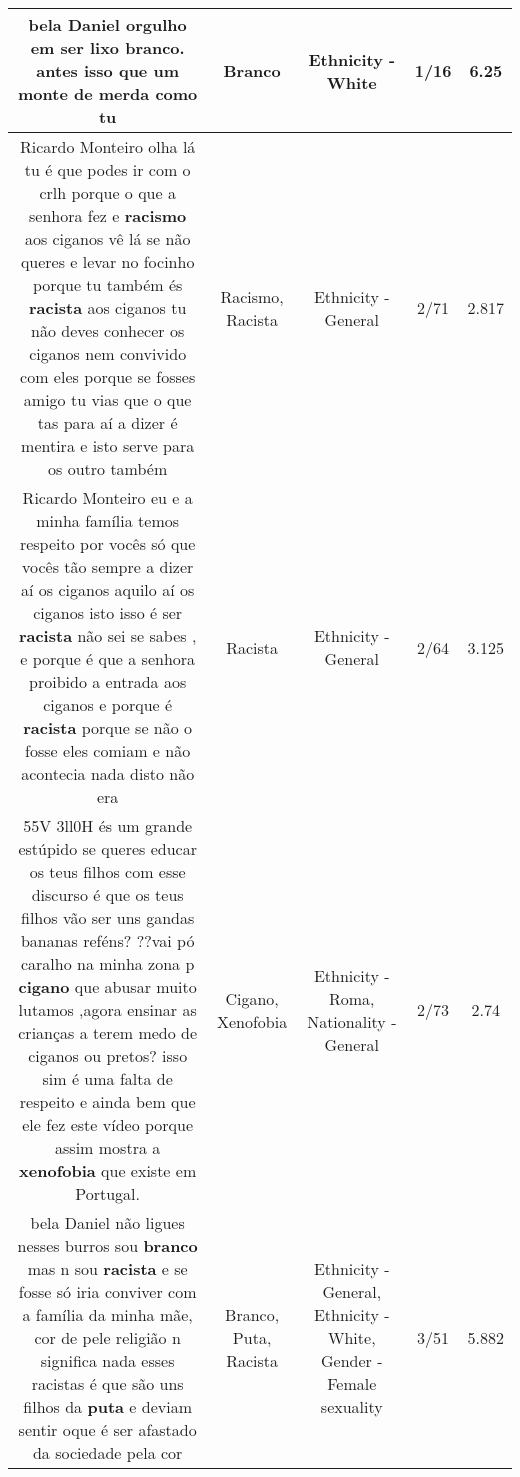 \documentclass[11pt]{article}
\newlength\mylength
\begin{document}
\begin{center}
\begin{longtable}{|C{.65\mylength}|C{.30\mylength}|C{.12\mylength}|C{.12\mylength}|C{.12\mylength}|}
  \small bela Daniel orgulho em ser lixo \textbf{branco}. antes isso que um monte de merda como tu\normalsize   & Branco & Ethnicity - White & 1/16 & 6.25 \\  \hline
  \small Ricardo Monteiro olha lá tu é que podes ir com o crlh porque o que a senhora fez e \textbf{racismo} aos ciganos vê lá se não queres e levar no focinho porque tu também és \textbf{racista} aos ciganos tu não deves conhecer os ciganos nem convivido com eles porque se fosses amigo tu vias que o que tas para aí a dizer é mentira e isto serve para os outro também\normalsize   & Racismo, Racista & Ethnicity - General & 2/71 & 2.817 \\  \hline
  \small Ricardo Monteiro  eu e a minha família temos respeito por vocês só que vocês tão sempre a dizer aí os ciganos aquilo aí os ciganos isto isso é ser \textbf{racista} não sei se sabes , e porque é que a senhora proibido a entrada aos ciganos  e porque é \textbf{racista} porque se não o fosse eles comiam e não acontecia nada disto não era\normalsize   & Racista & Ethnicity - General & 2/64 & 3.125 \\  \hline
  \small 55V 3ll0H és um grande estúpido se queres educar os teus filhos com esse discurso é que os teus filhos vão ser uns gandas bananas reféns? ??vai pó caralho na minha zona p \textbf{cigano} que abusar muito lutamos ,agora ensinar as crianças a terem medo de ciganos ou pretos? isso sim é uma falta de respeito e ainda bem que ele fez este vídeo porque assim mostra a \textbf{xenofobia} que existe em Portugal.\normalsize   & Cigano, Xenofobia & Ethnicity - Roma, Nationality - General & 2/73 & 2.74 \\  \hline
  \small bela Daniel não ligues nesses burros sou \textbf{branco} mas n sou \textbf{racista} e se fosse só iria conviver com a família da minha mãe, cor de pele religião n significa nada esses racistas é que são uns filhos da \textbf{puta} e deviam sentir oque é ser afastado da sociedade pela cor\normalsize   & Branco, Puta, Racista & Ethnicity - General, Ethnicity - White, Gender - Female sexuality & 3/51 & 5.882 \\  \hline

\end{longtable}
\end{center}
\end{document}
